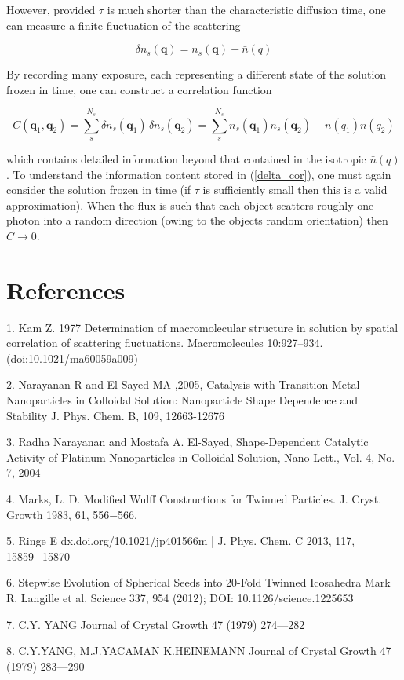 \documentclass [11pt,fleqn]{article}
\def \be {\begin{equation}}
\def \ee {\end{equation}}
\begin{document}
However, provided $\tau$ is much shorter than the characteristic diffusion time, one can measure a finite fluctuation of the scattering

\be \label{delta_s}
\delta n_s(\bm q) = n_s (\bm q) - \bar n (q )
\ee

By recording many exposure, each representing a different state of the solution frozen in time, one can construct a correlation function

\be \label{delta_cor}
C( \bm q_1, \bm q_2 ) = \sum_s^{N_s} \delta n_s( \bm q_1 )\, \delta n_s( \bm q_2 ) = \sum_s^{N_s} n_s( \bm q_1) n_s (\bm q_2 )  - \bar n( q_1) \bar n(q_2)
\ee

which contains detailed information beyond that contained in the isotropic $\bar n( q)$. To understand the information content stored in (\ref{delta_cor}), one must again consider the solution frozen in time (if $\tau$ is sufficiently small then this is a valid approximation). When the flux is such that each object scatters roughly one photon into a random direction (owing to the objects random orientation) then $C \rightarrow 0$. 

\section{References}

1. Kam Z. 1977 Determination of macromolecular structure in solution by spatial correlation of scattering fluctuations. Macromolecules 10:927–934. (doi:10.1021/ma60059a009)

2. Narayanan R and El-Sayed MA ,2005, Catalysis with Transition Metal Nanoparticles in Colloidal Solution: Nanoparticle Shape Dependence and Stability J. Phys. Chem. B, 109, 12663-12676

3. Radha Narayanan and Mostafa A. El-Sayed, Shape-Dependent Catalytic Activity of Platinum Nanoparticles in Colloidal Solution, Nano Lett., Vol. 4, No. 7, 2004

4. Marks, L. D. Modified Wulff Constructions for Twinned Particles. J. Cryst. Growth 1983, 61, 556−566.

5. Ringe E dx.doi.org/10.1021/jp401566m | J. Phys. Chem. C 2013, 117, 15859−15870

6. Stepwise Evolution of Spherical Seeds into 20-Fold Twinned Icosahedra Mark R. Langille et al. Science 337, 954 (2012); DOI: 10.1126/science.1225653

7. C.Y. YANG Journal of Crystal Growth 47 (1979) 274—282

8. C.Y.YANG, M.J.YACAMAN K.HEINEMANN Journal of Crystal Growth 47 (1979) 283—290
\end{document}
